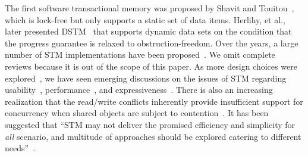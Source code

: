 \documentclass{sig-alternate-05-2015}
\begin{document}
The first software transactional memory was proposed by Shavit and Touitou~\cite{shavit1997software}, which is lock-free but only supports a static set of data items.
Herlihy, et al., later presented DSTM~\cite{herlihy2003software} that supports dynamic data sets on the condition that the progress guarantee is relaxed to obstruction-freedom.
Over the years, a large number of STM implementations have been proposed~\cite{saha2006mcrt,fraser2004practical,marathe2006lowering,dice2006transactional,dalessandro2010norec}.
We omit complete reviews because it is out of the scope of this paper.
As more design choices were explored~\cite{marathe2004design}, we have seen emerging discussions on the issues of STM regarding usability~\cite{Rossbach2010transactional}, performance~\cite{cascaval2008software}, and expressiveness~\cite{guerraoui2008obstruction}.
There is also an increasing realization that the read/write conflicts inherently provide insufficient support for concurrency when shared objects are subject to contention~\cite{koskinen2010coarse}.
It has been suggested that ``STM may not deliver the promised efficiency and simplicity for \emph{all} scenario, and multitude of approaches should be explored catering to different needs''~\cite{attiya2010inherent}.

\end{document}
